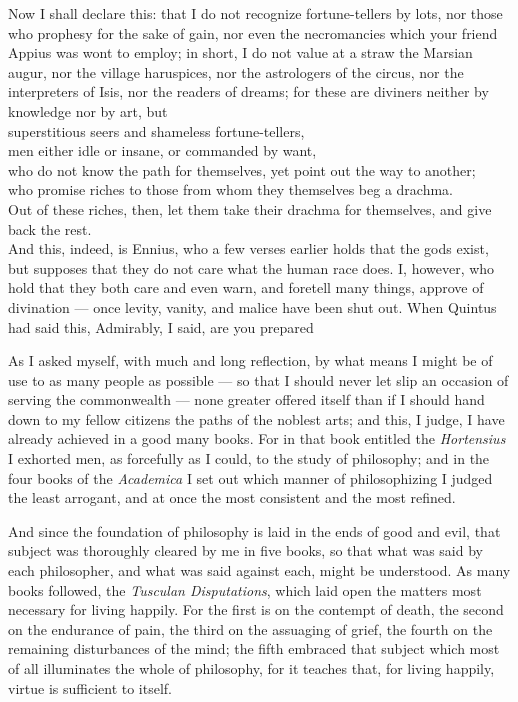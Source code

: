  Now I shall declare this: that I do not recognize fortune-tellers by lots, nor those who prophesy for the sake of gain, nor even the necromancies which your friend Appius was wont to employ; in short, I do not value at a straw the Marsian augur, nor the village haruspices, nor the astrologers of the circus, nor the interpreters of Isis, nor the readers of dreams; for these are diviners neither by knowledge nor by art, but \\
superstitious seers and shameless fortune-tellers, \\
men either idle or insane, or commanded by want, \\
who do not know the path for themselves, yet point out the way to another; \\
who promise riches to those from whom they themselves beg a drachma. \\
Out of these riches, then, let them take their drachma for themselves, and give back the rest. \\
And this, indeed, is Ennius, who a few verses earlier holds that the gods exist, but supposes that they do not care what the human race does. I, however, who hold that they both care and even warn, and foretell many things, approve of divination — once levity, vanity, and malice have been shut out. When Quintus had said this, Admirably, I said, are you prepared


 As I asked myself, with much and long reflection, by what means I might be of use to as many people as possible — so that I should never let slip an occasion of serving the commonwealth — none greater offered itself than if I should hand down to my fellow citizens the paths of the noblest arts; and this, I judge, I have already achieved in a good many books. For in that book entitled the \textit{Hortensius} I exhorted men, as forcefully as I could, to the study of philosophy; and in the four books of the \textit{Academica} I set out which manner of philosophizing I judged the least arrogant, and at once the most consistent and the most refined.

 And since the foundation of philosophy is laid in the ends of good and evil, that subject was thoroughly cleared by me in five books, so that what was said by each philosopher, and what was said against each, might be understood. As many books followed, the \textit{Tusculan Disputations}, which laid open the matters most necessary for living happily. For the first is on the contempt of death, the second on the endurance of pain, the third on the assuaging of grief, the fourth on the remaining disturbances of the mind; the fifth embraced that subject which most of all illuminates the whole of philosophy, for it teaches that, for living happily, virtue is sufficient to itself.

